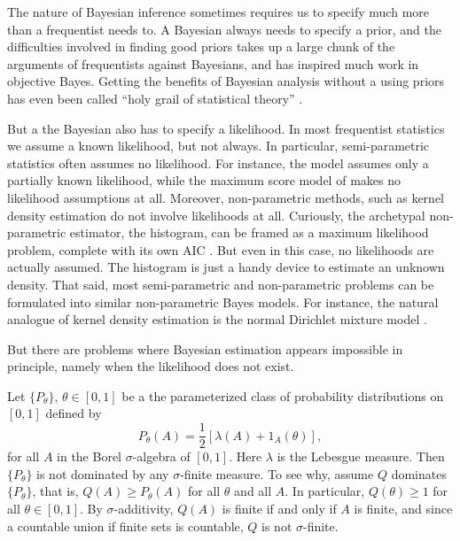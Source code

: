 The nature of Bayesian inference sometimes requires us to specify
much more than a frequentist needs to. A Bayesian always needs to
specify a prior, and the difficulties involved in finding good priors
takes up a large chunk of the arguments of frequentists against Bayesians,
and has inspired much work in objective Bayes. Getting the benefits
of Bayesian analysis without a using priors has even been called ``holy
grail of statistical theory'' . 

But a the Bayesian also has to specify a likelihood. In most frequentist
statistics we assume a known likelihood, but not always. In particular,
semi-parametric statistics often assumes no likelihood. For instance,
the \textcite{Cox1972-xd} model assumes only a partially known likelihood,
while the maximum score model of \textcite{Manski1975-gl} makes no likelihood
assumptions at all. Moreover, non-parametric methods, such as kernel
density estimation  do not involve likelihoods
at all. Curiously, the archetypal non-parametric estimator, the histogram,
can be framed as a maximum likelihood problem, complete with its own
AIC . But even in this case, no likelihoods are
actually assumed. The histogram is just a handy device to estimate
an unknown density. That said, most semi-parametric and non-parametric
problems can be formulated into similar non-parametric Bayes models.
For instance, the natural analogue of kernel density estimation is
the normal Dirichlet mixture model \parencite[Chapter 2.2]{Muller2015-xn}.

But there are problems where Bayesian estimation appears impossible
in principle, namely when the likelihood does not exist.
\begin{example}
\label{exa:no likelihood}Let $\{P_{\theta}\},\,\theta\in[0,1]$
be a the parameterized class of probability distributions on $[0,1]$
defined by
\begin{equation}
P_{\theta}(A)=\frac{1}{2}[\lambda(A)+1_{A}(\theta)],\label{eq:no likelihood}
\end{equation}
for all $A$ in the Borel $\sigma$-algebra of $[0,1]$. Here $\lambda$
is the Lebesgue measure. Then $\{P_{\theta}\}$ is not dominated by
any $\sigma$-finite measure. To see why, assume $Q$ dominates $\{P_{\theta}\}$,
that is, $Q(A)\geq P_{\theta}(A)$ for all $\theta$ and all $A$.
In particular, $Q(\theta)\geq1$ for all $\theta\in[0,1]$. By $\sigma$-additivity,
$Q(A)$ is finite if and only if $A$ is finite, and since a countable
union if finite sets is countable, $Q$ is not $\sigma$-finite.
\end{example}

